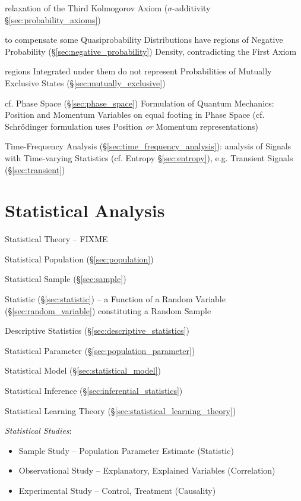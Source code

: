 relaxation of the Third Kolmogorov Axiom ($\sigma$-additivity
\S\ref{sec:probability_axioms})

to compensate some Quasiprobability Distributions have regions of Negative
Probability (\S\ref{sec:negative_probability}) Density, contradicting the First
Axiom

regions Integrated under them do not represent Probabilities of Mutually
Exclusive States (\S\ref{sec:mutually_exclusive})

cf. Phase Space (\S\ref{sec:phase_space}) Formulation of Quantum Mechanics:
Position and Momentum Variables on equal footing in Phase Space (cf.
Schr\"odinger formulation uses Position \emph{or} Momentum representations)

\fist Time-Frequency Analysis (\S\ref{sec:time_frequency_analysis}): analysis
of Signals with Time-varying Statistics (cf. Entropy \S\ref{sec:entropy}), e.g.
Transient Signals (\S\ref{sec:transient})



\section{Statistical Analysis}\label{sec:statistical_analysis}

Statistical Theory -- FIXME

Statistical Population (\S\ref{sec:population})

Statistical Sample (\S\ref{sec:sample})

Statistic (\S\ref{sec:statistic}) -- a Function of a Random Variable
(\S\ref{sec:random_variable}) constituting a Random Sample

Descriptive Statistics (\S\ref{sec:descriptive_statistics})

Statistical Parameter (\S\ref{sec:population_parameter})

Statistical Model (\S\ref{sec:statistical_model})

Statistical Inference (\S\ref{sec:inferential_statistics})

Statistical Learning Theory (\S\ref{sec:statistical_learning_theory})

\emph{Statistical Studies}:
\begin{itemize}
  \item Sample Study -- Population Parameter Estimate (Statistic)
  \item Observational Study -- Explanatory, Explained Variables (Correlation)
  \item Experimental Study -- Control, Treatment (Causality)
\end{itemize}



